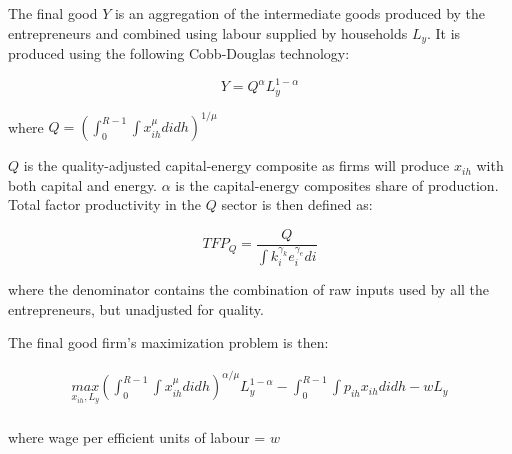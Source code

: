 \documentclass[12pt,a4paper]{article}
\begin{document}
\hspace*{6mm} The final good $Y$ is an aggregation of the intermediate goods produced by the entrepreneurs and combined using labour supplied by households $L_y$. It is produced using the following Cobb-Douglas technology:

   	
   	   \begin{equation}
      Y=Q^{\alpha}L_{y}^{1-\alpha}
        \end{equation}
          
                
            where $Q = (\int_{0}^{R-1}\int x_{ih}^\mu didh)^{1/\mu}$
            
$Q$ is the quality-adjusted capital-energy composite as firms will produce $x_{ih}$ with both capital and energy. $\alpha$ is the capital-energy composites share of production. Total factor productivity in the $Q$ sector is then defined as:

\begin{equation}
 TFP_Q = \frac{Q}{\int k_i^{\gamma_k} e_i^{\gamma_e} di}
\end{equation}
        
   where the denominator contains the combination of raw inputs used by all the entrepreneurs, but unadjusted for quality.
   
   
 The final good firm's maximization problem is then:
   	
%
%

   	
       \[
\begin{array}{ll}

\underset{{x_{ih}}, L_{y}}{max} (\int_{0}^{R-1}\int x_{ih}^\mu didh)^{\alpha/\mu}L_y^{1-\alpha} - \int_{0}^{R-1}\int p_{ih}x_{ih}didh-w L_{y}  \\

\end{array}
\]

\begin{center}
where wage per efficient units of labour = $w$
\end{center}
\end{document}
